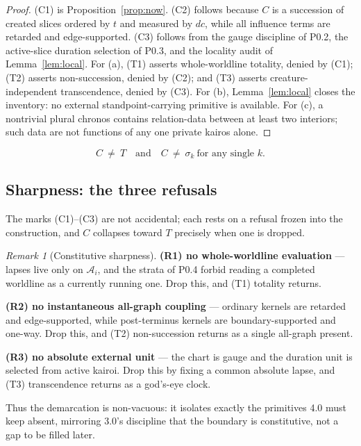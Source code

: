 \documentclass[11pt,a4paper]{article}
\def\mathfrak#1{#1}%
\theoremstyle{definition}
\theoremstyle{plain}
\theoremstyle{remark}
\newtheorem{remark}[definition]{Remark}
\begin{document}
\begin{proof}
(C1) is Proposition~\ref{prop:now}. (C2) follows because \(C\) is a succession of created
slices ordered by \(t\) and measured by \(d\mathfrak c\), while all influence terms are
retarded and edge-supported. (C3) follows from the gauge discipline of P0.2, the
active-slice duration selection of P0.3, and the locality audit of Lemma~\ref{lem:local}.
For (a), (T1) asserts whole-worldline totality, denied by (C1); (T2) asserts
non-succession, denied by (C2); and (T3) asserts creature-independent transcendence,
denied by (C3). For (b), Lemma~\ref{lem:local} closes the inventory: no external
standpoint-carrying primitive is available. For (c), a nontrivial plural chronos contains
relation-data between at least two interiors; such data are not functions of any one
private kairos alone. \qedhere
\end{proof}

\[
\boxed{\,C\ \neq\ T\quad\text{and}\quad C\ \neq\ \sigma_k\ \text{for any single }k.\,}
\]

\subsection{Sharpness: the three refusals}

The marks (C1)--(C3) are not accidental; each rests on a refusal frozen into the
construction, and \(C\) collapses toward \(T\) precisely when one is dropped.

\begin{remark}[Constitutive sharpness]\label{rem:sharp}
\textbf{(R1) no whole-worldline evaluation} --- lapses live only on \(\mathcal A_i\), and
the strata of P0.4 forbid reading a completed worldline as a currently running one. Drop
this, and (T1) totality returns.

\textbf{(R2) no instantaneous all-graph coupling} --- ordinary kernels are retarded and
edge-supported, while post-terminus kernels are boundary-supported and one-way. Drop
this, and (T2) non-succession returns as a single all-graph present.

\textbf{(R3) no absolute external unit} --- the chart is gauge and the duration unit is
selected from active kairoi. Drop this by fixing a common absolute lapse, and (T3)
transcendence returns as a god's-eye clock.

Thus the demarcation is non-vacuous: it isolates exactly the primitives 4.0 must keep
absent, mirroring 3.0's discipline that the boundary is constitutive, not a gap to be
filled later.
\end{remark}
\end{document}
